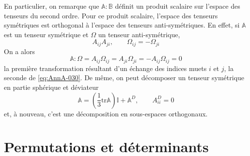 En particulier, on remarque que $\mathbb{A}:\mathbb{B}$ définit un produit scalaire sur l'espace des tenseurs du second ordre.
Pour ce produit scalaire, l'espace des tenseurs symétriques est orthogonal à l'espace des tenseurs anti-symétriques.
En effet, si $\mathbb{A}$ est un tenseur symétrique et $\mathbb{\Omega}$ un tenseur anti-symétrique,
\begin{equation}
    A_{ij} A_{ji},\qquad \Omega_{ij} = -\Omega_{ji}
    \label{eq:AnnA-030}
\end{equation}
On a alors 
\begin{equation}
    \mathbb{A}:\mathbb{\Omega} = A_{ij} \Omega_{ij} = A_{ji} \Omega_{ji} = -A_{ij} \Omega_{ij} = 0
    \label{eq:AnnA-031}
\end{equation}
la première transformation résultant d'un échange des indices muets $i$ et $j$, la seconde de \eqref{eq:AnnA-030}.
De même, on peut décomposer un tenseur symétrique en partie sphérique et déviateur
\begin{equation}
    \mathbb{A} = \left( \frac{1}{3} \mathrm{tr} \mathbb{A} \right) \mathbb{I} + \mathbb{A}^D , \qquad A_{ii}^D = 0
    \label{eq:AnnA-032}
\end{equation}
et, à nouveau, c'est une décomposition en sous-espaces orthogonaux.

\section{Permutations et déterminants}
